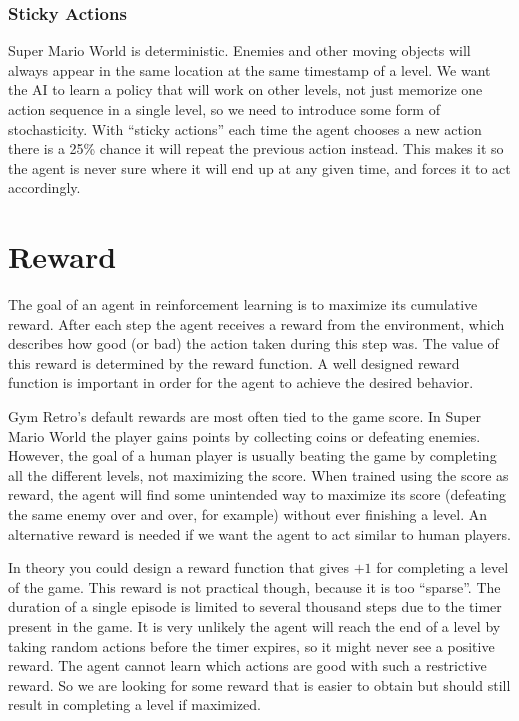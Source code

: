 \documentclass[a4paper]{article}
\begin{document}
\subsubsection{Sticky Actions}
Super Mario World is deterministic. 
Enemies and other moving objects will always appear in the same location at the same timestamp of a level.
We want the AI to learn a policy that will work on other levels, not just memorize one action sequence in a single level, so we need to introduce some form of stochasticity.
With ``sticky actions'' \cite{machado2018revisiting} each time the agent chooses a new action there is a 25\% chance it will repeat the previous action instead.
This makes it so the agent is never sure where it will end up at any given time, and forces it to act accordingly.

\section{Reward} \label{s:reward}
The goal of an agent in reinforcement learning is to maximize its cumulative reward.
After each step the agent receives a reward from the environment, which describes how good (or bad) the action taken during this step was.
The value of this reward is determined by the reward function.
A well designed reward function is important in order for the agent to achieve the desired behavior.

Gym Retro's default rewards are most often tied to the game score.
In Super Mario World the player gains points by collecting coins or defeating enemies.
However, the goal of a human player is usually beating the game by completing all the different levels, not maximizing the score.
When trained using the score as reward, the agent will find some unintended way to maximize its score (defeating the same enemy over and over, for example) without ever finishing a level.
An alternative reward is needed if we want the agent to act similar to human players.

In theory you could design a reward function that gives $+1$ for completing a level of the game.
This reward is not practical though, because it is too ``sparse''.
The duration of a single episode is limited to several thousand steps due to the timer present in the game.
It is very unlikely the agent will reach the end of a level by taking random actions before the timer expires, so it might never see a positive reward.
The agent cannot learn which actions are good with such a restrictive reward.
So we are looking for some reward that is easier to obtain but should still result in completing a level if maximized.
\end{document}
